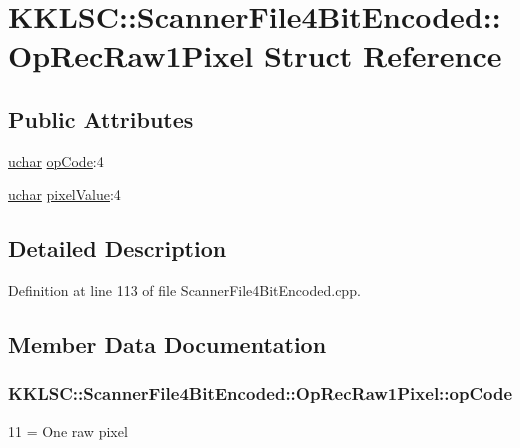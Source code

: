 \hypertarget{struct_scanner_file4_bit_encoded_1_1_op_rec_raw1_pixel}{}\section{K\+K\+L\+SC\+:\+:Scanner\+File4\+Bit\+Encoded\+:\+:Op\+Rec\+Raw1\+Pixel Struct Reference}
\label{struct_scanner_file4_bit_encoded_1_1_op_rec_raw1_pixel}
\subsection*{Public Attributes}
\begin{DoxyCompactItemize}
\item 
\hyperlink{namespace_k_k_b_ace9969169bf514f9ee6185186949cdf7}{uchar} \hyperlink{struct_scanner_file4_bit_encoded_1_1_op_rec_raw1_pixel_a6b87b6f025b21406b793c55f419d83c9}{op\+Code}\+:4
\item 
\hyperlink{namespace_k_k_b_ace9969169bf514f9ee6185186949cdf7}{uchar} \hyperlink{struct_scanner_file4_bit_encoded_1_1_op_rec_raw1_pixel_ae2dd94da5c3bed1079f807525d1fc8cc}{pixel\+Value}\+:4
\end{DoxyCompactItemize}


\subsection{Detailed Description}


Definition at line 113 of file Scanner\+File4\+Bit\+Encoded.\+cpp.



\subsection{Member Data Documentation}
\subsubsection[{\texorpdfstring{op\+Code}{opCode}}]{ K\+K\+L\+S\+C\+::\+Scanner\+File4\+Bit\+Encoded\+::\+Op\+Rec\+Raw1\+Pixel\+::op\+Code}\hypertarget{struct_scanner_file4_bit_encoded_1_1_op_rec_raw1_pixel_a6b87b6f025b21406b793c55f419d83c9}{}\label{struct_scanner_file4_bit_encoded_1_1_op_rec_raw1_pixel_a6b87b6f025b21406b793c55f419d83c9}
11 = One raw pixel 


